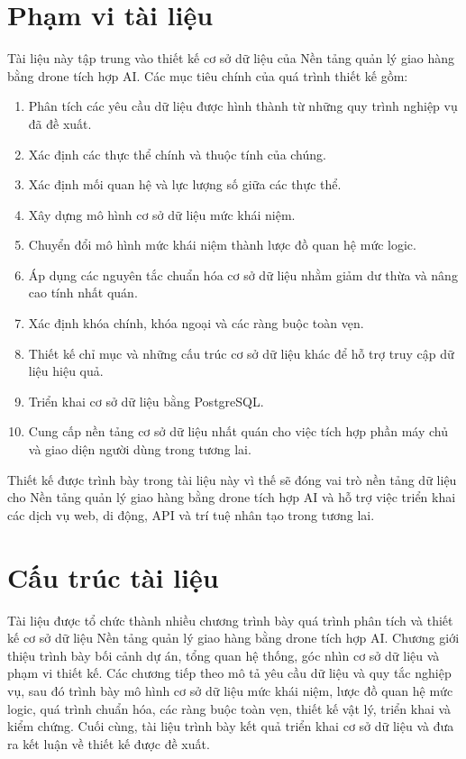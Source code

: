\section{Phạm vi tài liệu}

Tài liệu này tập trung vào thiết kế cơ sở dữ liệu của Nền tảng quản lý giao hàng bằng drone tích hợp AI. Các mục tiêu chính của quá trình thiết kế gồm:

\begin{enumerate}
\item Phân tích các yêu cầu dữ liệu được hình thành từ những quy trình nghiệp vụ đã đề xuất.
\item Xác định các thực thể chính và thuộc tính của chúng.
\item Xác định mối quan hệ và lực lượng số giữa các thực thể.
\item Xây dựng mô hình cơ sở dữ liệu mức khái niệm.
\item Chuyển đổi mô hình mức khái niệm thành lược đồ quan hệ mức logic.
\item Áp dụng các nguyên tắc chuẩn hóa cơ sở dữ liệu nhằm giảm dư thừa và nâng cao tính nhất quán.
\item Xác định khóa chính, khóa ngoại và các ràng buộc toàn vẹn.
\item Thiết kế chỉ mục và những cấu trúc cơ sở dữ liệu khác để hỗ trợ truy cập dữ liệu hiệu quả.
\item Triển khai cơ sở dữ liệu bằng PostgreSQL.
\item Cung cấp nền tảng cơ sở dữ liệu nhất quán cho việc tích hợp phần máy chủ và giao diện người dùng trong tương lai.
\end{enumerate}

Thiết kế được trình bày trong tài liệu này vì thế sẽ đóng vai trò nền tảng dữ liệu cho Nền tảng quản lý giao hàng bằng drone tích hợp AI và hỗ trợ việc triển khai các dịch vụ web, di động, API và trí tuệ nhân tạo trong tương lai.

\section{Cấu trúc tài liệu}

\qquad Tài liệu được tổ chức thành nhiều chương trình bày quá trình phân tích và thiết kế cơ sở dữ liệu Nền tảng quản lý giao hàng bằng drone tích hợp AI. Chương giới thiệu trình bày bối cảnh dự án, tổng quan hệ thống, góc nhìn cơ sở dữ liệu và phạm vi thiết kế. Các chương tiếp theo mô tả yêu cầu dữ liệu và quy tắc nghiệp vụ, sau đó trình bày mô hình cơ sở dữ liệu mức khái niệm, lược đồ quan hệ mức logic, quá trình chuẩn hóa, các ràng buộc toàn vẹn, thiết kế vật lý, triển khai và kiểm chứng. Cuối cùng, tài liệu trình bày kết quả triển khai cơ sở dữ liệu và đưa ra kết luận về thiết kế được đề xuất.
